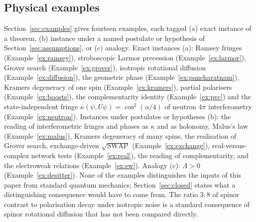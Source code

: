 \documentclass[aps,pra,onecolumn,superscriptaddress,nofootinbib,10pt]{revtex4-2}
\theoremstyle{definition}
\theoremstyle{remark}
\begin{document}
\subsection{Physical examples}
Section~\ref{sec:examples} gives fourteen examples, each tagged (a) exact instance of a theorem, (b)
instance under a named postulate or hypothesis of Section~\ref{sec:assumptions}, or (c) analogy.  Exact
instances (a): Ramsey fringes (Example~\ref{ex:ramsey}), stroboscopic Larmor precession
(Example~\ref{ex:larmor}), Grover search (Example~\ref{ex:grover}), isotropic rotational diffusion
(Example~\ref{ex:diffusion}), the geometric phase (Example~\ref{ex:pancharatnam}), Kramers degeneracy of one spin
(Example~\ref{ex:kramers}), partial polarisers (Example~\ref{ex:boosts}), the complementarity identity
(Example~\ref{ex:pvc}) and the state-independent fringe $\kappa(\psi,U\psi)=\cos^2(\alpha/4)$ of neutron $4\pi$
interferometry (Example~\ref{ex:neutron}).  Instances under postulates or hypotheses (b): the reading of
interferometric fringes and phases as $\kappa$ and as holonomy, Malus's law (Example~\ref{ex:malus}), Kramers
degeneracy of many spins, the realisation of Grover search, exchange-driven $\sqrt{\mathrm{SWAP}}$
(Example~\ref{ex:exchange}), real-versus-complex network tests (Example~\ref{ex:real}), the reading of
complementarity, and the electroweak relations (Example~\ref{ex:ew}).  Analogy (c): $\Lambda>0$
(Example~\ref{ex:desitter}).  None of the examples distinguishes the inputs of this paper from standard
quantum mechanics; Section~\ref{sec:closed} states what a distinguishing consequence would have to come
from.  The ratio $3:8$ of spinor contrast to polarisation decay under isotropic noise is a standard
consequence of spinor rotational diffusion that has not been compared directly.
\end{document}

